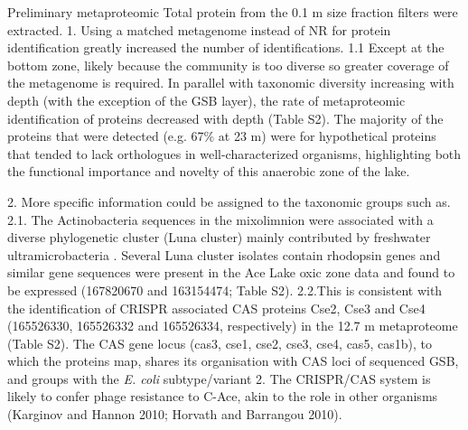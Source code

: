 Preliminary metaproteomic Total protein from the 0.1 \textmu{}m size fraction filters were extracted.
1. Using a matched metagenome instead of \ac{NR} for protein identification greatly increased the number of identifications.
1.1 Except at the bottom zone, likely because the community is too diverse so greater coverage of the metagenome is required. %
In parallel with taxonomic diversity increasing with depth (with the exception of the GSB layer), the rate of metaproteomic identification of proteins decreased with depth (Table S2). 
The majority of the proteins that were detected (e.g. 67\% at 23 m) were for hypothetical proteins that tended to lack orthologues in well-characterized organisms, highlighting both the functional importance and novelty of this anaerobic zone of the lake.


2. More specific information could be assigned to the taxonomic groups such as.
2.1. The Actinobacteria sequences in the mixolimnion were associated with a diverse phylogenetic cluster (Luna cluster) mainly contributed by freshwater ultramicrobacteria \cite{Hahn2003}. 
Several Luna cluster isolates contain rhodopsin genes \cite{Sharma2009} and similar gene sequences were present in the Ace Lake oxic zone data and found to be expressed (167820670 and 163154474; Table S2).
2.2.This is consistent with the identification of \ac{CRISPR} associated \ac{CAS} proteins Cse2, Cse3 and Cse4 (165526330, 165526332 and 165526334, respectively) in the 12.7 m metaproteome (Table S2). 
The \ac{CAS} gene locus (cas3, cse1, cse2, cse3, cse4, cas5, cas1b), to which the proteins map, shares its organisation with \ac{CAS} loci of sequenced \ac{GSB}, and groups with the \emph{E. coli} subtype/variant 2. The \ac{CRISPR}/\ac{CAS} system is likely to confer phage resistance to C-Ace, akin to the role in other organisms (Karginov and Hannon 2010; Horvath and Barrangou 2010).


